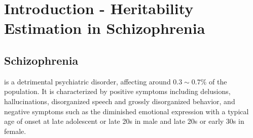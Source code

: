 \documentclass[12pt]{book}
\newcommand*{\Glng}{\Glsentrylong}
\begin{document}
	
	\chapter{Introduction - Heritability Estimation in Schizophrenia}
	\section{Schizophrenia}
	\Glng{scz} is a detrimental psychiatric disorder, affecting around $0.3\sim0.7\%$ of the population\citep{AmericanPsychiatricAssociation2013}.
	It is characterized by positive symptoms including delusions, hallucinations, disorganized speech and grossly disorganized behavior, and negative symptoms such as the diminished emotional expression\citep{AmericanPsychiatricAssociation2013} with a typical age of onset at late adolescent or late 20s in male and late 20s or early 30s in female\citep{Schultz2007}.
	
\end{document}
